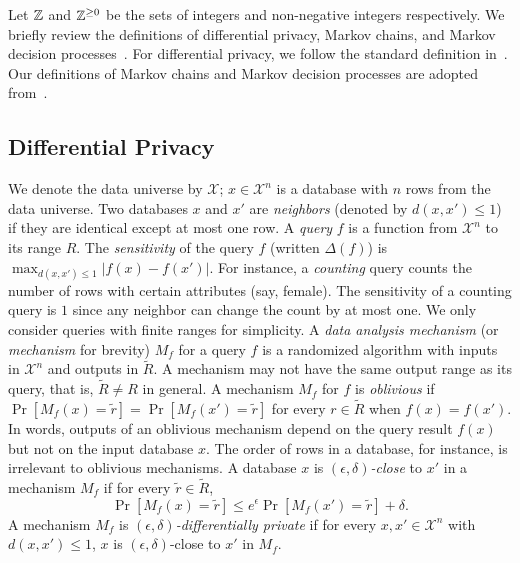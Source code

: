 
Let $\mathbb{Z}$ and $\mathbb{Z}^{\geq 0}$ be the sets of integers and
non-negative integers respectively.
We briefly review the definitions of differential privacy, Markov
chains, and Markov decision processes~\cite{Put05}. For differential privacy, we
follow the standard definition in~\cite{DR:14:AFDP,GRS:09:UUPM,GRS:12:UUPM}. Our
definitions of Markov chains and Markov decision processes are adopted
from~\cite{BK:08:PMC}.

\subsection{Differential Privacy}
We denote the data universe by $\mathcal{X}$; $x \in \mathcal{X}^n$ is
a database with $n$ rows from the data universe. Two databases $x$ and
$x'$ are \emph{neighbors} (denoted by $d(x, x') \leq 1$) if they are
identical except at most one row. A \emph{query} $f$ is a function
from $\mathcal{X}^n$ to its range $R$. The \emph{sensitivity} of the
query $f$ (written $\Delta (f)$) is $\max_{d(x, x') \leq 1} | f (x) -
f (x') |$. For instance, a \emph{counting} query counts the number
of rows with certain attributes (say, female). The sensitivity of a
counting query is $1$ since any neighbor can change the count by at
most one. We only consider queries with finite  ranges for simplicity.
A \emph{data analysis mechanism} (or
\emph{mechanism} for brevity) $M_f$ for a query $f$
is a randomized algorithm with inputs in $\mathcal{X}^n$ and outputs
in $\tilde{R}$.
A mechanism may not have the same output range as its query, that is,
$\tilde{R} \neq R$ in general.
A mechanism $M_f$ for $f$ is \emph{oblivious} if
$\Pr[M_f(x) = \tilde{r}] = \Pr[M_f(x') = \tilde{r}]$ for every
$r \in \tilde{R}$ when $f (x) = f (x')$. In words, outputs of an
oblivious mechanism depend on the query result $f (x)$ but not on the
input database $x$. The order of rows in a database, for instance, is
irrelevant to oblivious mechanisms. A database $x$ is
\emph{$(\epsilon, \delta)$-close} to $x'$ in a mechanism
$M_f$ if for every $\tilde{r} \in \tilde{R}$,
\[
\Pr[M_f (x) = \tilde{r}] \leq e^{\epsilon} \Pr[M_f (x') =
\tilde{r}] + \delta.
\]
A mechanism $M_f$ is \emph{$(\epsilon, \delta)$-differentially
  private} %
if for every $x, x' \in \mathcal{X}^n$ with $d(x, x') \leq 1$,
$x$ is $(\epsilon, \delta)$-close to $x'$ in $M_f$.

